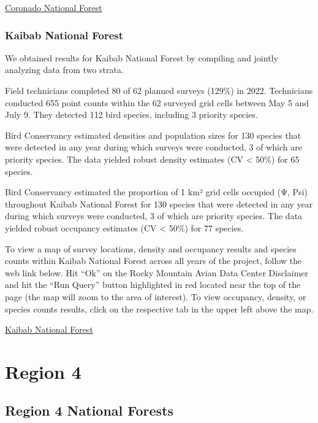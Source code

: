 \documentclass[
  letterpaper,
  DIV=11,
  numbers=noendperiod,
  oneside]{scrreprt}
\begin{document}
\href{http://www.rmbo.org/new_site/adc/QueryWindow.aspx\#N4IgzgrgDgpgTmALnAhoiBbEAuABCAYQHs4iA7FAEyNwDk0BLclAG1wDESYkQBfIA===}{Coronado
National Forest}

\hypertarget{kaibab-national-forest}{%
\subsubsection{Kaibab National Forest}\label{kaibab-national-forest}}

We obtained results for Kaibab National Forest by compiling and jointly
analyzing data from two strata.

Field technicians completed 80 of 62 planned surveys (129\%) in 2022.
Technicians conducted 655 point counts within the 62 surveyed grid cells
between May 5 and July 9. They detected 112 bird species, including 3
priority species.

Bird Conservancy estimated densities and population sizes for 130
species that were detected in any year during which surveys were
conducted, 3 of which are priority species. The data yielded robust
density estimates (CV \textless{} 50\%) for 65 species.

Bird Conservancy estimated the proportion of 1 km² grid cells occupied
(Ψ, Psi) throughout Kaibab National Forest for 130 species that were
detected in any year during which surveys were conducted, 3 of which are
priority species. The data yielded robust occupancy estimates (CV
\textless{} 50\%) for 77 species.

To view a map of survey locations, density and occupancy results and
species counts within Kaibab National Forest across all years of the
project, follow the web link below. Hit ``Ok'' on the Rocky Mountain
Avian Data Center Disclaimer and hit the ``Run Query'' button
highlighted in red located near the top of the page (the map will zoom
to the area of interest). To view occupancy, density, or species counts
results, click on the respective tab in the upper left above the map.

\href{http://www.rmbo.org/new_site/adc/QueryWindow.aspx\#N4IgzgrgDgpgTmALnAhoiBbEAuABCAaRQEsAjFU3AOTWIHsA7FAG1wDE64YkQBfIA===}{Kaibab
National Forest}

\hypertarget{region-4}{%
\section{Region 4}\label{region-4}}

\hypertarget{region-4-national-forests}{%
\subsection{Region 4 National Forests}\label{region-4-national-forests}}
\end{document}
